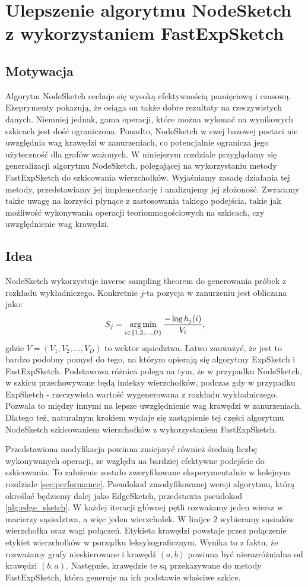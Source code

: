 \chapter{Ulepszenie algorytmu NodeSketch z wykorzystaniem FastExpSketch}
\section{Motywacja}
    Algorytm NodeSketch cechuje się wysoką efektywnością pamięciową i czasową. Ekeprymenty pokazują, że osiąga on także dobre rezultaty na rzeczywistych danych\cite{Yang_Rosso_Li_Cudre-Mauroux_2019}. 
    Niemniej jednak, gama operacji, które można wykonać na wynikowych szkicach jest dość ograniczona. Ponadto, NodeSketch w swej bazowej postaci nie uwzględnia wag krawędzi w zanurzeniach, co potencjalnie ogranicza jego użyteczność dla grafów ważonych.   
    W niniejszym rozdziale przyglądamy się generalizacji algorytmu NodeSketch, polegającej na wykorzystaniu metody FastExpSketch do szkicowania wierzchołków. Wyjaśniamy zasadę działania tej metody, przedstawiamy jej implementację i analizujemy jej złożoność. Zwracamy także uwagę na korzyści płynące z zastosowania takiego podejścia, takie jak możliwość wykonywania operacji teoriomnogościowych na szkicach, czy uwzględnienie wag krawędzi.

\section{Idea}
    NodeSketch wykorzystuje inverse sampling theorem do generowania próbek z rozkładu wykładniczego. Konkretnie $j$-ta pozycja w zanurzeniu jest obliczana jako: 
    \[  
        S_j = \operatorname*{arg\,min}_{i \in \{1,2,\dots, D\}} \frac{-\log h_{j}(i)}{V_i},
    \] 
    gdzie $V = (V_1, V_2, \dots, V_D)$ to wektor sąsiedztwa. Łatwo zauważyć, że jest to bardzo podobny pomysł do tego, na którym opierają się algorytmy ExpSketch i FastExpSketch. Podstawowa różnica polega na tym, że w przypadku NodeSketch, w szkicu przechowywane będą indeksy wierzchołków, podczas gdy w przypadku ExpSketch - rzeczywista wartość wygenerowana z rozkładu wykładniczego. Pozwala to między innymi na lepsze uwzględnienie wag krawędzi w zanurzeniach. Dlatego też, naturalnym krokiem wydaje się zastąpienie tej części algorytmu NodeSketch szkicowaniem wierzchołków z wykorzystaniem FastExpSketch.

    Przedstawiona modyfikacja powinna zmiejszyć również średnią liczbę wykonywanych operacji, ze względu na bardziej efektywne podejście do szkicowania. To założenie zostało zweryfikowane eksperymentalnie w kolejnym rozdziale \ref{sec:performance}. Pseudokod zmodyfikowanej wersji algorytmu, którą określać będziemy dalej jako EdgeSketch, przedstawia pseudokod \ref{alg:edge_sketch}. W każdej iteracji głównej pętli rozważamy jeden wiersz w macierzy sąsiedztwa, a więc jeden  wierzchołek. W linijce $2$ wybieramy sąsiadów wierzchołka oraz wagi połączeń. Etykieta krawędzi powstaje przez połączenie etykiet wierzchołków w porządku leksykograficznym. Wynika to z faktu, że rozważamy grafy nieskierowane i krawędź $(a,b)$ powinna być nierozróżnialna od krawędzi $(b,a)$. Następnie, krawędzie te są przekazywane do metody FastExpSketch, która generuje na ich podstawie właściwe szkice.  

